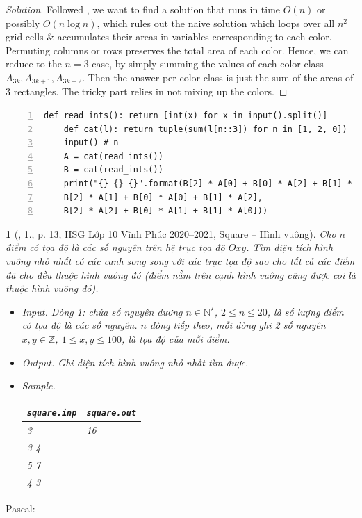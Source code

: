 \documentclass{article}
\newtheorem{baitoan}{}
\begin{document}
\begin{proof}[Solution]
	Followed \cite[Sect. 1.8, pp. 39--41]{Durr_Vie2021}, we want to find a solution that runs in time $O(n)$ or possibly $O(n\log n)$, which rules out the naive solution which loops over all $n^2$ grid cells \& accumulates their areas in variables corresponding to each color. Permuting columns or rows preserves the total area of each color. Hence, we can reduce to the $n = 3$ case, by simply summing the values of each color class $A_{3k},A_{3k+1},A_{3k+2}$. Then the answer per color class is just the sum of the areas of 3 rectangles. The tricky part relies in not mixing up the colors.
\end{proof}

\begin{Verbatim}[numbers=left,xleftmargin=5mm]
	def read_ints(): return [int(x) for x in input().split()]
	def cat(l): return tuple(sum(l[n::3]) for n in [1, 2, 0])
	input() # n
	A = cat(read_ints())
	B = cat(read_ints())
	print("{} {} {}".format(B[2] * A[0] + B[0] * A[2] + B[1] * A[1],
	B[2] * A[1] + B[0] * A[0] + B[1] * A[2],
	B[2] * A[2] + B[0] * A[1] + B[1] * A[0]))
\end{Verbatim}

\begin{baitoan}[\cite{Trung_HSG_THPT_Tin}, 1., p. 13, HSG Lớp 10 Vĩnh Phúc 2020--2021, Square -- Hình vuông]
	Cho $n$ điểm có tọa độ là các số nguyên trên hệ trục tọa độ $Oxy$. Tìm diện tích hình vuông nhỏ nhất có các cạnh song song với các trục tọa độ sao cho tất cả các điểm đã cho đều thuộc hình vuông đó (điểm nằm trên cạnh hình vuông cũng được coi là thuộc hình vuông đó).
	\begin{itemize}
		\item {\sf Input.} Dòng 1: chứa số nguyên dương $n\in\mathbb{N}^\star$, $2\le n\le20$, là số lượng điểm có tọa độ là các số nguyên. $n$ dòng tiếp theo, mỗi dòng ghi 2 số nguyên $x,y\in\mathbb{Z}$, $1\le x,y\le100$, là tọa độ của mỗi điểm.
		\item {\sf Output.} Ghi diện tích hình vuông nhỏ nhất tìm được.
		\item {\sf Sample.}
		\begin{table}[H]
			\centering
			\begin{tabular}{|l|l|}
				\hline
				{\tt square.inp} & {\tt square.out} \\
				\hline
				3 & 16 \\
				3 4 &  \\
				5 7 &  \\
				4 3 &  \\
				\hline
			\end{tabular}
		\end{table}
	\end{itemize}
\end{baitoan}
\noindent Pascal:
\end{document}

